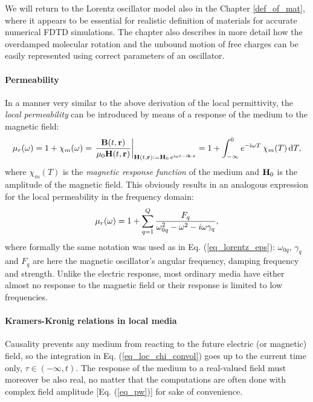 We will return to the Lorentz oscillator model also in the Chapter \ref{def_of_mat}, where it appears to be essential for realistic definition of materials for accurate numerical FDTD simulations. The chapter also describes in more detail how the overdamped molecular rotation and the unbound motion of free charges can be easily represented using correct parameters of an oscillator.
\paragraph{Permeability}  %
In a manner very similar to the above derivation of the local permittivity, the \textit{local permeability} can be introduced by means of a response of the medium to the magnetic field:
\begin{equation} \mu_r(\omega) = 1 + \chi_m(\omega) = \left.\frac{\mathbf{B}(t,{\mathbf{r}})}{\mu_0\mathbf{H}(t,{\mathbf{r}})} \right|_{\mathbf{H}(t, {\mathbf{r}}) := \mathbf{H}_0 \, e^{{\mathrm i}\omega t - {\mathrm i}{\mathbf{k}}\cdot{\mathbf{r}}}} = 1 + \int_{-\infty}^{0} e^{-{\mathrm i}\omega T} \,\chi_m(T) \,\mbox{d}T, \label{eq_mu_loc}\end{equation}
where $\chi_m(T)$ is the \textit{magnetic response function} of the medium and $\mathbf{H}_0$ is the amplitude of the magnetic field. This obviously results in an analogous expression for the local permeability in the frequency domain:
\begin{equation} \mu_r(\omega) = 1 + \sum_{q=1}^Q \frac{F_q}{\omega_{0q}^2 - \omega^2 - i\omega\gamma_q}, \label{eq_lorentz_mu}\end{equation} 
where formally the same notation was used as in  Eq. (\ref{eq_lorentz_eps}): $\omega_{0q}$, $\gamma_q$ and $F_q$ are here the magnetic oscillator's angular frequency, damping frequency and strength. Unlike the electric response, most ordinary media have either almost no response to the magnetic field or their response is limited to low frequencies.

\paragraph{Kramers-Kronig relations in local media}%
Causality prevents any medium from reacting to the future electric (or magnetic) field, so the integration in Eq. (\ref{eq_loc_chi_convol}) goes up to the current time only, $\tau \in (-\infty, t)$. The response of the medium to a real-valued field must moreover be also real, no matter that the computations are often done with complex field amplitude [Eq. (\ref{eq_pw})] for sake of convenience. 

